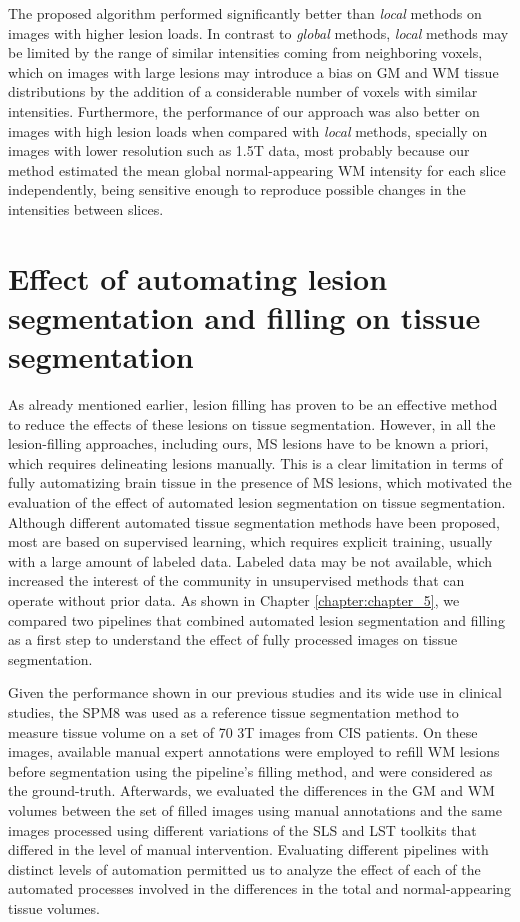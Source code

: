 The proposed algorithm performed significantly better than \textit{local} methods on images with higher lesion loads. In contrast to \textit{global} methods, \textit{local} methods may be limited by the range of similar intensities coming from neighboring voxels, which on images with large lesions may introduce a bias on GM and WM tissue distributions by the addition of a considerable number of voxels with similar intensities. Furthermore, the performance of our approach was also better on images with high lesion loads when compared with \textit{local} methods, specially on images with lower resolution such as 1.5T data, most probably because our method estimated the mean global normal-appearing WM intensity for each slice independently, being sensitive enough to reproduce possible changes in the intensities between slices.


\section{Effect of automating lesion segmentation and filling on  tissue segmentation}
\label{sec:label}

As already mentioned earlier, lesion filling has proven to be an effective method to reduce the effects of these lesions on tissue segmentation. However, in all the lesion-filling approaches, including ours, MS lesions have to be known a priori, which requires delineating lesions manually. This is a clear limitation in terms of fully automatizing brain tissue in the presence of MS lesions, which motivated the evaluation of the effect of automated lesion segmentation on tissue segmentation. Although different automated tissue segmentation methods have been proposed, most are based on supervised learning, which requires explicit training, usually with a large amount of labeled data. Labeled data may be not available, which increased the interest of the community in unsupervised methods that can operate without prior data. As shown in Chapter \ref{chapter:chapter_5}, we compared two pipelines that combined automated lesion segmentation and filling as a first step to understand the effect of fully processed images on tissue segmentation. 
 
Given the performance shown in our previous studies and its wide use in clinical studies, the SPM8 was used as a reference tissue segmentation method to measure tissue volume on a set of 70 3T images from CIS patients. On these images, available manual expert annotations were employed to refill WM lesions before segmentation using the pipeline's filling method, and were considered as the ground-truth. Afterwards, we evaluated the differences in the GM and WM volumes between the set of filled images using manual annotations and the same images processed using different variations of the SLS and LST toolkits that differed in the level of manual intervention. Evaluating different pipelines with distinct levels of automation  permitted us to analyze the effect of each of the automated processes involved in the differences in the total and normal-appearing tissue volumes.  

